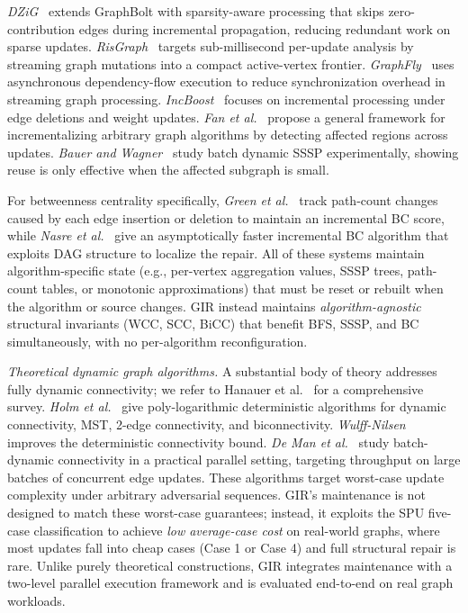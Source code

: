 \textit{DZiG}~\cite{mariappan2021dzig} extends GraphBolt with sparsity-aware
processing that skips zero-contribution edges during incremental propagation,
reducing redundant work on sparse updates.
\textit{RisGraph}~\cite{feng2021risgraph} targets sub-millisecond per-update
analysis by streaming graph mutations into a compact active-vertex frontier.
\textit{GraphFly}~\cite{chen2022graphfly} uses asynchronous dependency-flow
execution to reduce synchronization overhead in streaming graph processing.
\textit{IncBoost}~\cite{yin2024incboost} focuses on incremental processing
under edge deletions and weight updates.
\textit{Fan et al.}~\cite{fan2021incrementalizing} propose a general framework
for incrementalizing arbitrary graph algorithms by detecting affected
regions across updates.
\textit{Bauer and Wagner}~\cite{bauer2009batch} study batch dynamic SSSP
experimentally, showing reuse is only effective when the affected
subgraph is small.

For betweenness centrality specifically, \textit{Green et al.}~\cite{green2012fast}
track path-count changes caused by each edge insertion or deletion to maintain
an incremental BC score, while \textit{Nasre et al.}~\cite{Nasre2014IncBC}
give an asymptotically faster incremental BC algorithm that exploits DAG structure
to localize the repair.
All of these systems maintain algorithm-specific state (e.g., per-vertex
aggregation values, SSSP trees, path-count tables, or monotonic approximations)
that must be reset or rebuilt when the algorithm or source changes.
GIR instead maintains \emph{algorithm-agnostic} structural invariants
(WCC, SCC, BiCC) that benefit BFS, SSSP, and BC simultaneously, with no
per-algorithm reconfiguration.

\textit{Theoretical dynamic graph algorithms.}
A substantial body of theory addresses fully dynamic connectivity; we refer
to Hanauer et al.~\cite{Hanauer2022DynSurvey} for a comprehensive survey.
\textit{Holm et al.}~\cite{holm2001poly} give poly-logarithmic deterministic
algorithms for dynamic connectivity, MST, 2-edge connectivity, and
biconnectivity.
\textit{Wulff-Nilsen}~\cite{wulff2013faster} improves the deterministic
connectivity bound.
\textit{De Man et al.}~\cite{de2025towards} study batch-dynamic
connectivity in a practical parallel setting, targeting throughput on
large batches of concurrent edge updates.
These algorithms target worst-case update complexity under arbitrary adversarial
sequences.
GIR's maintenance is not designed to match these worst-case guarantees; instead,
it exploits the SPU five-case classification to achieve \emph{low average-case
cost} on real-world graphs, where most updates fall into cheap cases (Case 1
or Case 4) and full structural repair is rare.
Unlike purely theoretical constructions, GIR integrates maintenance with a
two-level parallel execution framework and is evaluated end-to-end on real
graph workloads.


